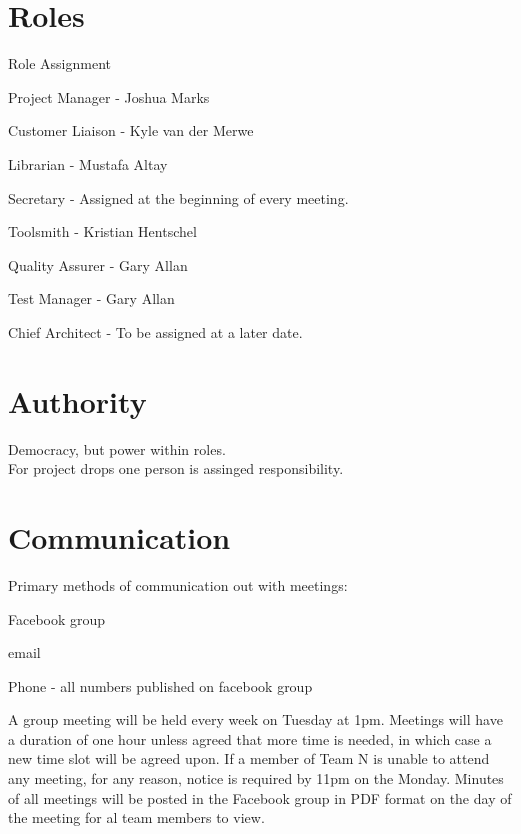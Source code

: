 \documentclass{l3deliverable}
\begin{document}
\section{Roles}

 Role Assignment
\begin{list}{}{}
\item Project Manager - Joshua Marks
\item Customer Liaison - Kyle van der Merwe
\item Librarian - Mustafa Altay
\item Secretary - Assigned at the beginning of every meeting.
\item Toolsmith - Kristian Hentschel
\item Quality Assurer - Gary Allan
\item Test Manager - Gary Allan
\item Chief Architect - To be assigned at a later date.
\end{list}



\section{Authority}

Democracy, but power within roles.\\
For project drops one person is assinged responsibility.


\section{Communication}

Primary methods of communication out with meetings:
\begin{list}{}{}
\item Facebook group
\item email
\item Phone - all numbers published on facebook group
\end{list}
A group meeting will be held every week on Tuesday at 1pm. Meetings will have a duration of one hour unless agreed that more time is needed, in which case a new time slot will be agreed upon.
If a member of Team N is unable to attend any meeting, for any reason, notice is required by 11pm on the Monday. Minutes of all meetings will be posted in the Facebook group in PDF format on the day of the meeting for al team members to view.
\end{document}
